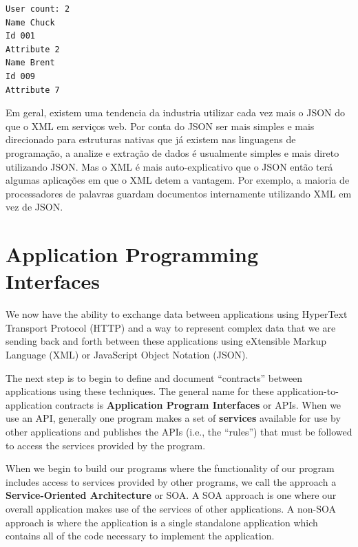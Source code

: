 \beforeverb
\begin{verbatim}
User count: 2
Name Chuck
Id 001
Attribute 2
Name Brent
Id 009
Attribute 7
\end{verbatim}
\afterverb
%
Em geral, existem uma tendencia da industria utilizar cada vez mais o JSON
do que o XML em serviços web. Por conta do JSON ser mais simples e mais
direcionado para estruturas nativas que já existem nas linguagens de
programação, a analize e extração de dados é usualmente simples e mais direto
utilizando JSON. Mas o XML é mais auto-explicativo que o JSON então terá
algumas aplicações em que o XML detem a vantagem. Por exemplo, a maioria de 
processadores de palavras guardam documentos internamente utilizando XML
em vez de JSON.

\section{Application Programming Interfaces}

We now have the ability to exchange data between applications using HyperText
Transport Protocol (HTTP) and a way to represent complex data that we are 
sending back and forth between these applications using eXtensible 
Markup Language (XML) or JavaScript Object Notation (JSON).

The next step is to begin to define and document ``contracts'' between 
applications using these techniques. The general name for these 
application-to-application contracts is {\bf Application Program 
Interfaces} or APIs.  When we use an API, generally one program
makes a set of {\bf services} available for use by other applications
and publishes the APIs (i.e., the ``rules'') that must be followed to 
access the services provided by the program.

When we begin to build our programs where the functionality of
our program includes access to services provided by other programs, 
we call the approach a {\bf Service-Oriented Architecture} or SOA.
A SOA approach is one where our overall application makes use of 
the services of other applications.  A non-SOA approach is where the
application is a single standalone application which contains all of the
code necessary to implement the application.


